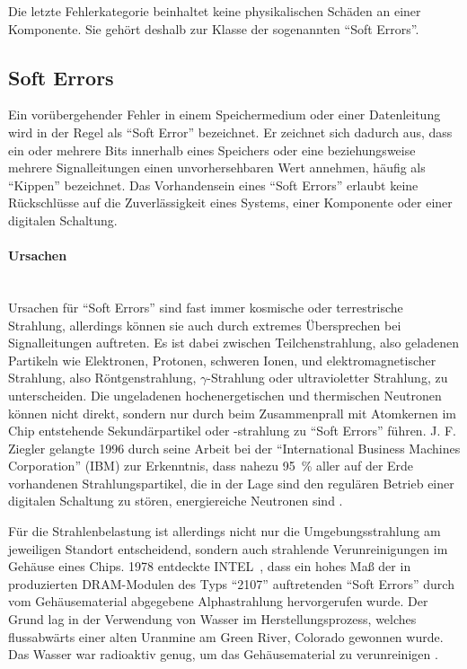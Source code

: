 Die letzte Fehlerkategorie beinhaltet keine physikalischen Schäden an
einer Komponente. Sie gehört deshalb zur Klasse der sogenannten
``Soft Errors''. 

\subsection{Soft Errors}
\label{sec:grundlagen_soft_errors}

Ein vorübergehender Fehler in einem Speichermedium oder einer
Datenleitung  wird in der Regel als ``Soft Error'' bezeichnet. Er
zeichnet sich dadurch aus, dass ein oder mehrere Bits innerhalb
eines Speichers oder eine beziehungsweise mehrere Signalleitungen einen
unvorhersehbaren Wert annehmen, häufig als ``Kippen'' bezeichnet. Das
Vorhandensein eines ``Soft Errors'' erlaubt keine Rückschlüsse auf die
Zuverlässigkeit eines Systems, einer Komponente oder einer digitalen
Schaltung.

\paragraph{Ursachen}\hspace{0cm}\\
\label{sec:grundlagen_soft_errors_ursachen}
Ursachen für ``Soft Errors'' sind fast immer kosmische oder
terrestrische Strahlung, allerdings können sie auch durch extremes
Übersprechen bei Signalleitungen auftreten. Es ist dabei zwischen
Teilchenstrahlung, also geladenen Partikeln wie Elektronen, Protonen,
schweren Ionen, und elektromagnetischer Strahlung, also
Röntgenstrahlung, $\gamma$-Strahlung oder ultravioletter Strahlung, zu
unterscheiden. Die ungeladenen hochenergetischen und thermischen
Neutronen können nicht direkt, sondern nur durch beim Zusammenprall
mit Atomkernen im Chip entstehende Sekundärpartikel oder -strahlung
zu ``Soft Errors'' führen. J. F. Ziegler gelangte 1996 durch seine
Arbeit bei der ``International Business Machines Corporation'' (IBM)
zur Erkenntnis, dass nahezu 95~\% aller auf der Erde vorhandenen
Strahlungspartikel, die in der Lage sind den regulären Betrieb einer
digitalen Schaltung zu stören, energiereiche Neutronen
sind \cite{ziegler1996b}.

Für die Strahlenbelastung ist allerdings nicht nur die
Umgebungsstrahlung am jeweiligen Standort entscheidend, sondern auch
strahlende Verunreinigungen im Gehäuse eines Chips. 1978  entdeckte
INTEL\TCop\ , dass ein hohes Maß der in produzierten DRAM-Modulen des
Typs ``2107'' auftretenden ``Soft Errors'' durch vom Gehäusematerial
abgegebene Alphastrahlung hervorgerufen wurde. Der Grund lag in der
Verwendung von Wasser im Herstellungsprozess, welches flussabwärts
einer alten Uranmine am Green River, Colorado gewonnen wurde. Das
Wasser war radioaktiv genug, um das Gehäusematerial zu verunreinigen
\cite{ziegler1996a}.

